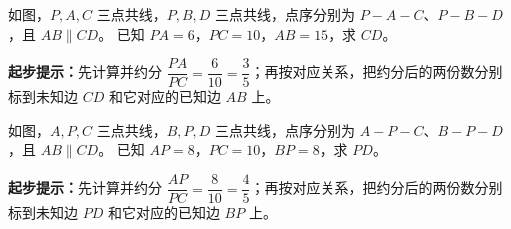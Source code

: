 \documentclass{exam-zh}
\begin{document}

\begin{problem}[points=10]
  \noindent
  \begin{minipage}[t]{\dimexpr\linewidth-60mm-6mm\relax}
    \vspace{0pt}
    如图，$P,A,C$ 三点共线，$P,B,D$ 三点共线，点序分别为 $P-A-C$、$P-B-D$，且 $AB\parallel CD$。
已知 $PA=6$，$PC=10$，$AB=15$，求 $CD$。
    \begin{hintbox}
\textbf{起步提示：}先计算并约分 $\dfrac{PA}{PC}=\dfrac{6}{10}=\dfrac{3}{5}$；再按对应关系，把约分后的两份数分别标到未知边 $CD$ 和它对应的已知边 $AB$ 上。\end{hintbox}

  \end{minipage}\hfill
  \begin{diagramcoltikz}{60mm}{先看平行边方向，再判断 A 字型或 8 字型及对应边。}
  }
  \end{diagramcoltikz}
  \par\medskip
  \answerarea[42mm]
\end{problem}



\begin{problem}[points=10]
  \noindent
  \begin{minipage}[t]{\dimexpr\linewidth-60mm-6mm\relax}
    \vspace{0pt}
    如图，$A,P,C$ 三点共线，$B,P,D$ 三点共线，点序分别为 $A-P-C$、$B-P-D$，且 $AB\parallel CD$。
已知 $AP=8$，$PC=10$，$BP=8$，求 $PD$。
    \begin{hintbox}
\textbf{起步提示：}先计算并约分 $\dfrac{AP}{PC}=\dfrac{8}{10}=\dfrac{4}{5}$；再按对应关系，把约分后的两份数分别标到未知边 $PD$ 和它对应的已知边 $BP$ 上。\end{hintbox}

  \end{minipage}\hfill
  \begin{diagramcoltikz}{60mm}{先看平行边方向，再判断 A 字型或 8 字型及对应边。}
  }
  \end{diagramcoltikz}
  \par\medskip
  \answerarea[42mm]
\end{problem}
\end{document}
